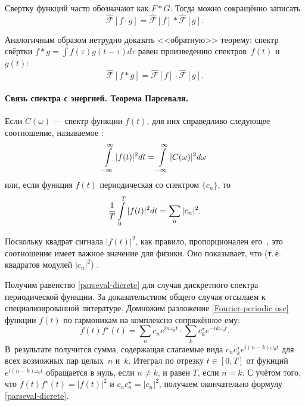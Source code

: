 
Свертку функций часто обозначают как $F * G$. Тогда можно сокращённо записать
\begin{equation*}
 \hat{\mathcal{F}}[f\cdot g] = \hat{\mathcal{F}}[f] * \hat{\mathcal{F}}[g].
\end{equation*}

Аналогичным образом нетрудно доказать <<обратную>> теорему:
спектр свёртки $f*g = \int f(\tau) g(t-\tau) d\tau$ равен произведению
спектров~$f(t)$ и~$g(t)$:
\begin{equation*}
\hat{\mathcal{F}}[f*g] = \hat{\mathcal{F}}[f] \cdot \hat{\mathcal{F}}[g].
\end{equation*}

\paragraph{Связь спектра с энергией. Теорема Парсеваля.}
Если $C(\omega)$ --- спектр функции $f(t)$, для них справедливо следующее
соотношение, называемое :
\begin{equation}
    \eqmark{parseval-int}
\int\limits_{-\infty}^{\infty} |f(t)|^2 dt =
\int\limits_{-\infty}^{\infty} |C(\omega)|^2 d\omega
\end{equation}
или, если функция $f(t)$ периодическая со спектром $\{c_n\}$, то
\begin{equation}
    \eqmark{parseval-dicrete}
\frac{1}{T}\int\limits_{0}^{T} |f(t)|^2 dt =
\sum\limits_n |c_n|^2.
\end{equation}

Поскольку квадрат сигнала $|f(t)|^2$, как правило, пропорционален
его~, это соотношение имеет важное значение для физики.
Оно показывает, что  (т.\,е. квадратов модулей $|c_n|^2$)
.

Получим равенство \eqref{parseval-dicrete} для случая дискретного спектра
периодической функции. За доказательством общего случая отсылаем
к специализированной литературе. Домножим разложение
\eqref{Fourier-periodic osc} функции $f(t)$ по гармоникам на комплексно
сопряжённое ему:
\begin{equation*}f(t)f^{\star}(t) = \sum\limits_n c_n e^{i n \omega_0 t} \cdot \sum\limits_k c_k^{\star} e^{-i k \omega_0 t}.\end{equation*}
В~результате получится сумма, содержащая слагаемые вида
$c_n c_k^{\star} e^{i(n-k)\omega_0 t}$ для всех возможных пар целых~$n$ и~$k$.
Итеграл по отрезку $t\in[0,T]$ от фукнций $e^{i(n-k)\omega_0 t}$
обращается в нуль, если $n\ne k$, и равен $T$, если $n=k$.
С учётом того, что $f(t)f^{\star}(t) = |f(t)|^2$ и
$c_n c_n^{\star} = |c_n|^2$, получаем окончательно формулу
\eqref{parseval-dicrete}.



